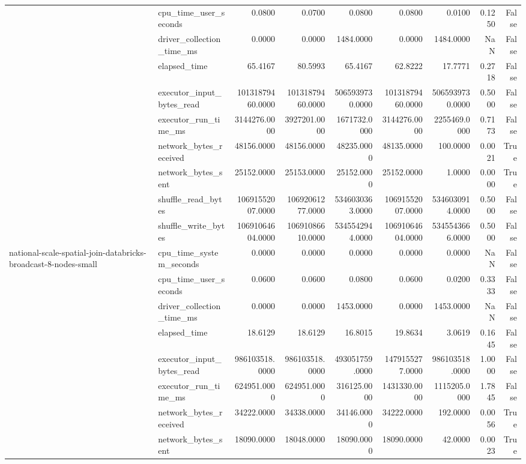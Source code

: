 \begin{tabular}{llrrrrrrr}
 & cpu\_time\_user\_seconds & 0.0800 & 0.0700 & 0.0800 & 0.0800 & 0.0100 & 0.1250 & False \\
 & driver\_collection\_time\_ms & 0.0000 & 0.0000 & 1484.0000 & 0.0000 & 1484.0000 & NaN & False \\
 & elapsed\_time & 65.4167 & 80.5993 & 65.4167 & 62.8222 & 17.7771 & 0.2718 & False \\
 & executor\_input\_bytes\_read & 10131879460.0000 & 10131879460.0000 & 5065939730.0000 & 10131879460.0000 & 5065939730.0000 & 0.5000 & False \\
 & executor\_run\_time\_ms & 3144276.0000 & 3927201.0000 & 1671732.0000 & 3144276.0000 & 2255469.0000 & 0.7173 & False \\
 & network\_bytes\_received & 48156.0000 & 48156.0000 & 48235.0000 & 48135.0000 & 100.0000 & 0.0021 & True \\
 & network\_bytes\_sent & 25152.0000 & 25153.0000 & 25152.0000 & 25152.0000 & 1.0000 & 0.0000 & True \\
 & shuffle\_read\_bytes & 10691552007.0000 & 10692061277.0000 & 5346030363.0000 & 10691552007.0000 & 5346030914.0000 & 0.5000 & False \\
 & shuffle\_write\_bytes & 10691064604.0000 & 10691086610.0000 & 5345542944.0000 & 10691064604.0000 & 5345543666.0000 & 0.5000 & False \\
\cline{1-9}
\multirow[t]{10}{*}{national-scale-spatial-join-databricks-broadcast-8-nodes-small} & cpu\_time\_system\_seconds & 0.0000 & 0.0000 & 0.0000 & 0.0000 & 0.0000 & NaN & False \\
 & cpu\_time\_user\_seconds & 0.0600 & 0.0600 & 0.0800 & 0.0600 & 0.0200 & 0.3333 & False \\
 & driver\_collection\_time\_ms & 0.0000 & 0.0000 & 1453.0000 & 0.0000 & 1453.0000 & NaN & False \\
 & elapsed\_time & 18.6129 & 18.6129 & 16.8015 & 19.8634 & 3.0619 & 0.1645 & False \\
 & executor\_input\_bytes\_read & 986103518.0000 & 986103518.0000 & 493051759.0000 & 1479155277.0000 & 986103518.0000 & 1.0000 & False \\
 & executor\_run\_time\_ms & 624951.0000 & 624951.0000 & 316125.0000 & 1431330.0000 & 1115205.0000 & 1.7845 & False \\
 & network\_bytes\_received & 34222.0000 & 34338.0000 & 34146.0000 & 34222.0000 & 192.0000 & 0.0056 & True \\
 & network\_bytes\_sent & 18090.0000 & 18048.0000 & 18090.0000 & 18090.0000 & 42.0000 & 0.0023 & True \\

\end{tabular}
